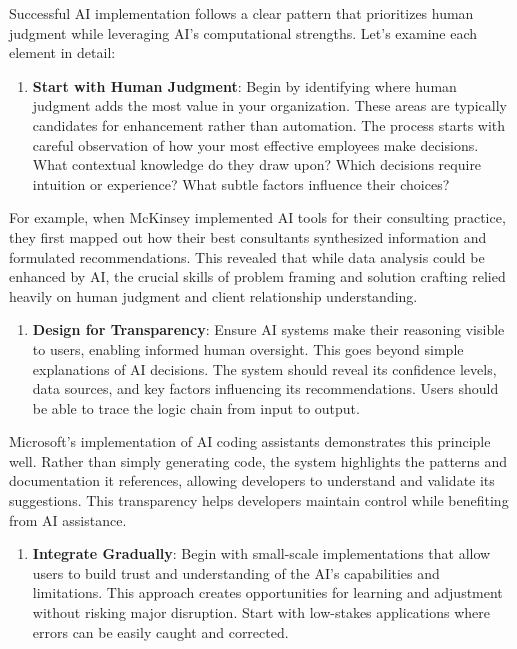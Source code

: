 \documentclass[
  Letterpaper,
]{scrbook}
\providecommand{\tightlist}{%
  \setlength{\itemsep}{0pt}\setlength{\parskip}{0pt}}\usepackage{longtable,booktabs,array}
\begin{document}
Successful AI implementation follows a clear pattern that prioritizes
human judgment while leveraging AI's computational strengths. Let's
examine each element in detail:

\begin{enumerate}
\def\labelenumi{\arabic{enumi}.}
\tightlist
\item
  \textbf{Start with Human Judgment}: Begin by identifying where human
  judgment adds the most value in your organization. These areas are
  typically candidates for enhancement rather than automation. The
  process starts with careful observation of how your most effective
  employees make decisions. What contextual knowledge do they draw upon?
  Which decisions require intuition or experience? What subtle factors
  influence their choices?
\end{enumerate}

For example, when McKinsey implemented AI tools for their consulting
practice, they first mapped out how their best consultants synthesized
information and formulated recommendations. This revealed that while
data analysis could be enhanced by AI, the crucial skills of problem
framing and solution crafting relied heavily on human judgment and
client relationship understanding.

\begin{enumerate}
\def\labelenumi{\arabic{enumi}.}
\setcounter{enumi}{1}
\tightlist
\item
  \textbf{Design for Transparency}: Ensure AI systems make their
  reasoning visible to users, enabling informed human oversight. This
  goes beyond simple explanations of AI decisions. The system should
  reveal its confidence levels, data sources, and key factors
  influencing its recommendations. Users should be able to trace the
  logic chain from input to output.
\end{enumerate}

Microsoft's implementation of AI coding assistants demonstrates this
principle well. Rather than simply generating code, the system
highlights the patterns and documentation it references, allowing
developers to understand and validate its suggestions. This transparency
helps developers maintain control while benefiting from AI assistance.

\begin{enumerate}
\def\labelenumi{\arabic{enumi}.}
\setcounter{enumi}{2}
\tightlist
\item
  \textbf{Integrate Gradually}: Begin with small-scale implementations
  that allow users to build trust and understanding of the AI's
  capabilities and limitations. This approach creates opportunities for
  learning and adjustment without risking major disruption. Start with
  low-stakes applications where errors can be easily caught and
  corrected.
\end{enumerate}
\end{document}
